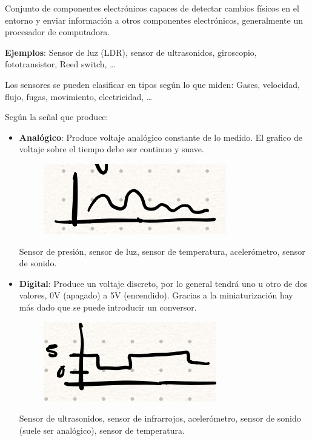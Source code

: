 \documentclass[12pt]{report} %
\begin{document}
Conjunto de componentes electrónicos capaces de detectar cambios físicos
en el entorno y enviar información a otros componentes electrónicos,
generalmente un procesador de computadora.

\textbf{Ejemplos}: Sensor de luz (LDR), sensor de ultrasonidos,
giroscopio, fototransistor, Reed switch, \ldots{}

Los sensores se pueden clasificar en tipos según lo que miden: Gases,
velocidad, flujo, fugas, movimiento, electricidad, \ldots{}

Según la señal que produce:

\begin{itemize}

\item
  \textbf{Analógico}: Produce voltaje analógico constante de lo medido.
  El grafico de voltaje sobre el tiempo debe ser continuo y suave.

\begin{figure}[H]
	{\includegraphics[scale=.5]{image-20210307210139988.png}}
\end{figure}

    Sensor de presión, sensor de luz, sensor de temperatura,
    acelerómetro, sensor de sonido.

\item
  \textbf{Digital}: Produce un voltaje discreto, por lo general tendrá
  uno u otro de dos valores, 0V (apagado) a 5V (encendido). Gracias a la
  miniaturización hay más dado que se puede introducir un conversor.

\begin{figure}[H]
	{\includegraphics[scale=.5]{image-20210307210421078.png}}
\end{figure}

    Sensor de ultrasonidos, sensor de infrarrojos, acelerómetro, sensor
    de sonido (suele ser analógico), sensor de temperatura.
\end{itemize}
\end{document}
